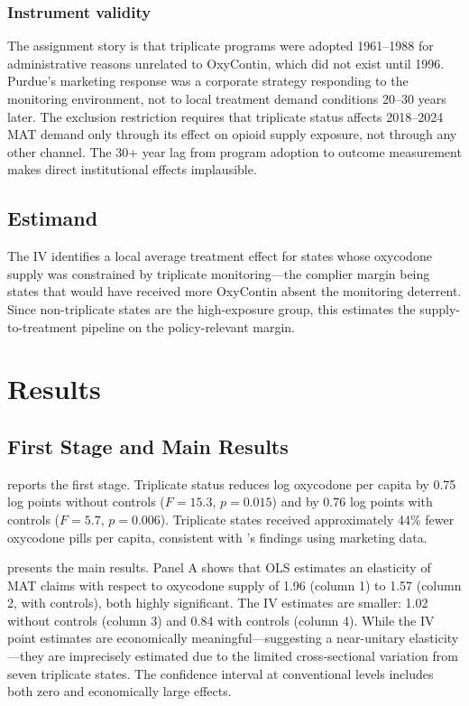 \documentclass[12pt]{article}
\begin{document}
\subsubsection*{Instrument validity} The assignment story is that triplicate programs were adopted 1961--1988 for administrative reasons unrelated to OxyContin, which did not exist until 1996. Purdue's marketing response was a corporate strategy responding to the monitoring environment, not to local treatment demand conditions 20--30 years later. The exclusion restriction requires that triplicate status affects 2018--2024 MAT demand only through its effect on opioid supply exposure, not through any other channel. The 30+ year lag from program adoption to outcome measurement makes direct institutional effects implausible.

\subsection{Estimand}

The IV identifies a local average treatment effect for states whose oxycodone supply was constrained by triplicate monitoring---the complier margin being states that would have received more OxyContin absent the monitoring deterrent. Since non-triplicate states are the high-exposure group, this estimates the supply-to-treatment pipeline on the policy-relevant margin.

\section{Results}

\subsection{First Stage and Main Results}



 reports the first stage. Triplicate status reduces log oxycodone per capita by 0.75 log points without controls ($F = 15.3$, $p = 0.015$) and by 0.76 log points with controls ($F = 5.7$, $p = 0.006$). Triplicate states received approximately 44\% fewer oxycodone pills per capita, consistent with \citet{AlpertPowellPacula2022}'s findings using marketing data.



 presents the main results. Panel A shows that OLS estimates an elasticity of MAT claims with respect to oxycodone supply of 1.96 (column 1) to 1.57 (column 2, with controls), both highly significant. The IV estimates are smaller: 1.02 without controls (column 3) and 0.84 with controls (column 4). While the IV point estimates are economically meaningful---suggesting a near-unitary elasticity---they are imprecisely estimated due to the limited cross-sectional variation from seven triplicate states. The confidence interval at conventional levels includes both zero and economically large effects.
\end{document}
